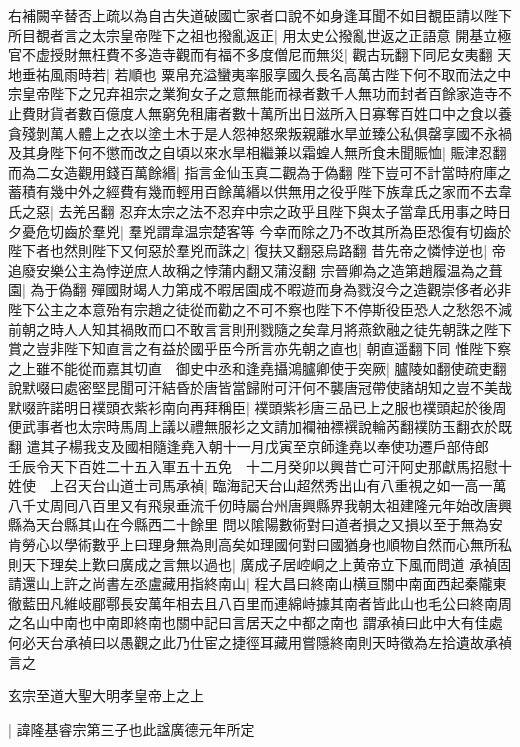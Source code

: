 右補闕辛替否上疏以為自古失道破國亡家者口說不如身逢耳聞不如目覩臣請以陛下所目覩者言之太宗皇帝陛下之祖也撥亂返正|{
	用太史公撥亂世返之正語意}
開基立極官不虚授財無枉費不多造寺觀而有福不多度僧尼而無災|{
	觀古玩翻下同尼女夷翻}
天地垂祐風雨時若|{
	若順也}
粟帛充溢蠻夷率服享國久長名高萬古陛下何不取而法之中宗皇帝陛下之兄弃祖宗之業狥女子之意無能而禄者數千人無功而封者百餘家造寺不止費財貨者數百億度人無窮免租庸者數十萬所出日滋所入日寡奪百姓口中之食以養貪殘剝萬人體上之衣以塗土木于是人怨神怒衆叛親離水旱並臻公私俱罄享國不永禍及其身陛下何不懲而改之自頃以來水旱相繼兼以霜蝗人無所食未聞賑恤|{
	賑津忍翻}
而為二女造觀用錢百萬餘緡|{
	指言金仙玉真二觀為于偽翻}
陛下豈可不計當時府庫之蓄積有幾中外之經費有幾而輕用百餘萬緡以供無用之役乎陛下族韋氏之家而不去韋氏之惡|{
	去羌呂翻}
忍弃太宗之法不忍弃中宗之政乎且陛下與太子當韋氏用事之時日夕憂危切齒於羣兇|{
	羣兇謂韋温宗楚客等}
今幸而除之乃不改其所為臣恐復有切齒於陛下者也然則陛下又何惡於羣兇而誅之|{
	復扶又翻惡烏路翻}
昔先帝之憐悖逆也|{
	帝追廢安樂公主為悖逆庶人故稱之悖蒲内翻又蒲沒翻}
宗晉卿為之造第趙履温為之葺園|{
	為于偽翻}
殫國財竭人力第成不暇居園成不暇遊而身為戮沒今之造觀崇侈者必非陛下公主之本意殆有宗趙之徒從而勸之不可不察也陛下不停斯役臣恐人之愁怨不減前朝之時人人知其禍敗而口不敢言言則刑戮隨之矣韋月將燕欽融之徒先朝誅之陛下賞之豈非陛下知直言之有益於國乎臣今所言亦先朝之直也|{
	朝直遥翻下同}
惟陛下察之上雖不能從而嘉其切直　御史中丞和逢堯攝鴻臚卿使于突厥|{
	臚陵如翻使疏吏翻}
說默啜曰處密堅昆聞可汗結昏於唐皆當歸附可汗何不襲唐冠帶使諸胡知之豈不美哉默啜許諾明日襆頭衣紫衫南向再拜稱臣|{
	襆頭紫衫唐三品已上之服也襆頭起於後周便武事者也太宗時馬周上議以禮無服衫之文請加襴䄂褾襈說輪芮翻襆防玉翻衣於既翻}
遣其子楊我支及國相隨逢堯入朝十一月戊寅至京師逢堯以奉使功遷戶部侍郎　壬辰令天下百姓二十五入軍五十五免　十二月癸卯以興昔亡可汗阿史那獻馬招慰十姓使　上召天台山道士司馬承禎|{
	臨海記天台山超然秀出山有八重視之如一高一萬八千丈周囘八百里又有飛泉垂流千仞時屬台州唐興縣界我朝太祖建隆元年始改唐興縣為天台縣其山在今縣西二十餘里}
問以隂陽數術對曰道者損之又損以至于無為安肯勞心以學術數乎上曰理身無為則高矣如理國何對曰國猶身也順物自然而心無所私則天下理矣上歎曰廣成之言無以過也|{
	廣成子居崆峒之上黄帝立下風而問道}
承禎固請還山上許之尚書左丞盧藏用指終南山|{
	程大昌曰終南山横亘關中南面西起秦隴東徹藍田凡維岐郿鄠長安萬年相去且八百里而連綿峙據其南者皆此山也毛公曰終南周之名山中南也中南即終南也關中記曰言居天之中都之南也}
謂承禎曰此中大有佳處何必天台承禎曰以愚觀之此乃仕宦之捷徑耳藏用嘗隱終南則天時徵為左拾遺故承禎言之

玄宗至道大聖大明孝皇帝上之上

|{
	諱隆基睿宗第三子也此諡廣德元年所定}


